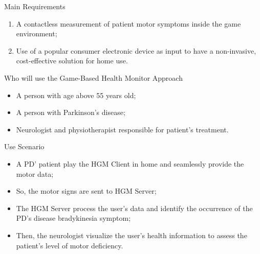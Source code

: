 \documentclass{beamer}
\begin{document}
\begin{frame}
    \begin{block}{Main Requirements}
		    \begin{enumerate}[<+->]
            \item A contactless measurement of patient motor symptoms inside the game environment;
						\item Use of a popular consumer electronic device as input to have a non-invasive, cost-effective solution for home use.
        \end{enumerate}
    \end{block}
\end{frame}


\begin{frame}
    \begin{block}{Who will use the Game-Based Health Monitor Approach}
        \begin{itemize}[<+->]
            \item A person with age above 55 years old;
            \item A person with Parkinson's disease;
            \item Neurologist and physiotherapist responsible for patient's treatment.
        \end{itemize}
    \end{block}
\end{frame}


\begin{frame}{}
   \begin{block}{Use Scenario}
      \begin{itemize}[<+->]
       \item A PD' patient play the HGM Client in home and seamlessly provide the motor data;
       \item So, the motor signs are sent to HGM Server;
       \item The HGM Server process the user's data and identify the occurrence of the PD's disease bradykinesia symptom;
       \item Then, the neurologist visualize the user's health information to assess the patient's level of motor deficiency.
      \end{itemize}
  \end{block}
\end{frame}
\end{document}
